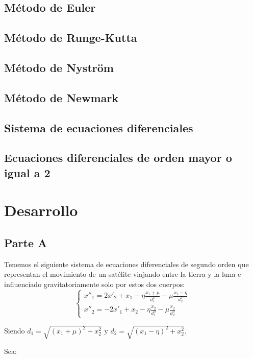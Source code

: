 \documentclass[titlepage,a4paper]{article}
\begin{document}
	\subsection{Método de Euler}
	\subsection{Método de Runge-Kutta}
	\subsection{Método de Nystr\"om}
	\subsection{Método de Newmark}
	\subsection{Sistema de ecuaciones diferenciales}
	\subsection{Ecuaciones diferenciales de orden mayor o igual a 2}

\section{Desarrollo}\label{sec:desarrollo}
	\subsection{Parte A}\label{sec:parteA}

		Tenemos el siguiente sistema de ecuaciones diferenciales de segundo orden que representan el movimiento de un satélite
		viajando entre la tierra y la luna e influenciado gravitatoriamente solo por estos dos cuerpos:
		\begin{equation}
			\begin{cases}
				x''_{1} = 2x'_{2} + x_{1} - \eta\frac{x_{1} + \mu}{d_{1}^{3}} - \mu\frac{x_{1}-\eta}{d_{2}^{3}}\\
				x''_{2} = -2x'_{1} + x_{2} - \eta\frac{x_{2}}{d_{1}^{3}} - \mu\frac{x_{2}}{d_{2}^{3}}
			\end{cases}
		\end{equation}

		Siendo $d_{1}=\sqrt{(x_{1}+\mu)^{2} + x_{2}^{2}}$ y $d_{2}=\sqrt{(x_{1}-\eta)^{2} + x_{2}^{2}}$.

		Sea:
\end{document}
